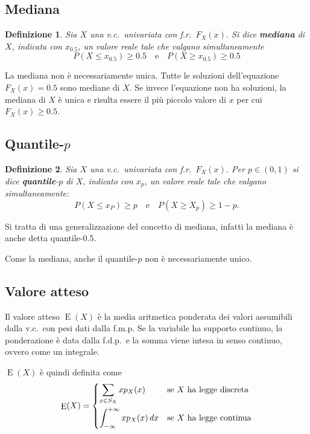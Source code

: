 \documentclass[11pt,a4paper,twoside]{article}
\newtheorem{definition}{Definizione}
\let\leq\leqslant%
\let\geq\geqslant%
\newcommand\dx{\,dx}
\DeclareMathOperator{\E}{E}
\begin{document}
\subsection{Mediana}
\begin{definition}
  Sia \(X\) una v.c.\ univariata con f.r.\ \(F_X(x)\). Si dice
  \textbf{mediana} di \(X\), indicata con \(x_{0.5}\), un valore reale
  tale che valgano simultaneamente
  \[
    P(X \leq x_{0.5}) \geq 0.5
    \quad\mbox{e}\quad
    P(X \geq x_{0.5}) \geq 0.5
  \]
\end{definition}

La mediana non è necessariamente unica. Tutte le soluzioni
dell'equazione \(F_X(x) = 0.5\) sono mediane di \(X\). Se invece
l'equazione non ha soluzioni, la mediana di \(X\) è unica e risulta
essere il più piccolo valore di \(x\) per cui \(F_X(x) \geq 0.5\).

\subsection{Quantile-\(p\)}
\begin{definition}
  Sia \(X\) una v.c.\ univariata con f.r.\ \(F_X(x)\).  Per \(p\in
  (0,1)\) si dice \textbf{quantile}-\(p\) di \(X\), indicato con
  \(x_p\), un valore reale tale che valgano simultaneamente:
  \[
    P(X \leq x_P) \geq p
    \quad\mbox{e}\quad
    P(X \geq X_p) \geq 1 - p.
  \]
\end{definition}

Si tratta di una generalizzazione del concetto di mediana, infatti la
mediana è anche detta quantile-0.5.

Come la mediana, anche il quantile-\(p\) non è necessariamente unico.

\subsection{Valore atteso}
Il valore atteso \(\E(X)\) è la media aritmetica ponderata dei valori
assumibili dalla v.c.\ con pesi dati dalla f.m.p. Se la variabile ha
supporto continuo, la ponderazione è data dalla f.d.p.\ e la somma
viene intesa in senso continuo, ovvero come un integrale.

\(\E(X)\) è quindi definita come
\[
  \E(X) = \begin{dcases}
    \sum_{x\in S_X} x p_X(x) &\mbox{se \(X\) ha legge discreta} \\
    \int_{-\infty}^{+\infty} x p_X(x) \dx &\mbox{se \(X\) ha legge continua}
  \end{dcases}
\]
\end{document}
